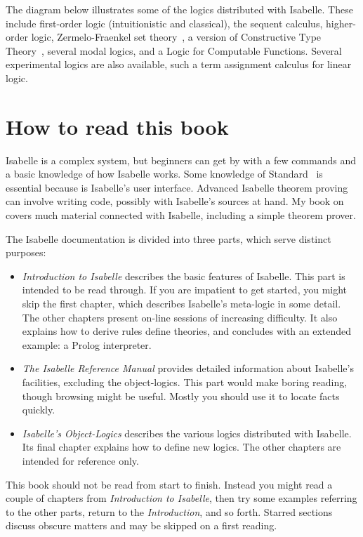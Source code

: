 The diagram below illustrates some of the logics distributed with Isabelle.
These include first-order logic (intuitionistic and classical), the sequent
calculus, higher-order logic, Zermelo-Fraenkel set theory~\cite{suppes72},
a version of Constructive Type Theory~\cite{nordstrom90}, several modal
logics, and a Logic for Computable Functions.  Several experimental
logics are also available, such a term assignment calculus for linear
logic.  

\centerline{}


\section*{How to read this book}
Isabelle is a complex system, but beginners can get by with a few commands
and a basic knowledge of how Isabelle works.  Some knowledge of
Standard~\ML{} is essential because \ML{} is Isabelle's user interface.
Advanced Isabelle theorem proving can involve writing \ML{} code, possibly
with Isabelle's sources at hand.  My book on~\ML{}~\cite{paulson91} covers
much material connected with Isabelle, including a simple theorem prover.

The Isabelle documentation is divided into three parts, which serve
distinct purposes:
\begin{itemize}
\item {\em Introduction to Isabelle\/} describes the basic features of
  Isabelle.  This part is intended to be read through.  If you are
  impatient to get started, you might skip the first chapter, which
  describes Isabelle's meta-logic in some detail.  The other chapters
  present on-line sessions of increasing difficulty.  It also explains how
  to derive rules define theories, and concludes with an extended example:
  a Prolog interpreter.

\item {\em The Isabelle Reference Manual\/} provides detailed information
  about Isabelle's facilities, excluding the object-logics.  This part
  would make boring reading, though browsing might be useful.  Mostly you
  should use it to locate facts quickly.

\item {\em Isabelle's Object-Logics\/} describes the various logics
  distributed with Isabelle.  Its final chapter explains how to define new
  logics.  The other chapters are intended for reference only.
\end{itemize}
This book should not be read from start to finish.  Instead you might read
a couple of chapters from {\em Introduction to Isabelle}, then try some
examples referring to the other parts, return to the {\em Introduction},
and so forth.  Starred sections discuss obscure matters and may be skipped
on a first reading.



